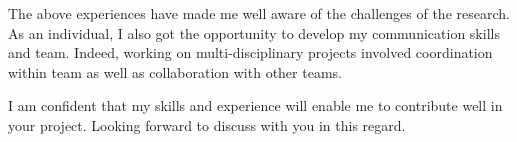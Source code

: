 \documentclass[12pt,stdletter,orderfromtodate,sigleft]{newlfm}
\begin{document}
\begin{newlfm}
 The above experiences have made me well aware of the challenges of the research. As an individual, I also got the opportunity to develop my communication skills and team. Indeed, working on multi-disciplinary projects involved coordination within  team as well as collaboration with other teams. 

I am confident that my skills and experience will enable me to contribute well  in  your project. Looking forward to discuss with you in this regard.

\end{newlfm}
\end{document}
